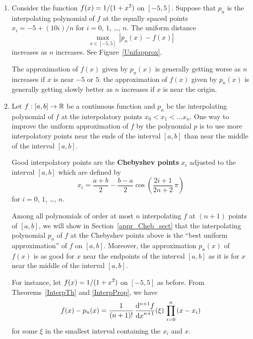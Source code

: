 \begin{rmkList}
\begin{enumerate}
\item Consider the function $\displaystyle f(x) = 1/(1+x^2)$ on
$[-5,5]$.  Suppose that $p_n$ is the interpolating polynomial of $f$
at the equally spaced points $x_i = -5 + (10i)/n$ for $i=0$, $1$, \ldots, $n$.
The uniform distance
\[
\max_{x \in [-5,5]}\,|p_n(x) - f(x)|
\]
increases as $n$ increases.  See Figure~\ref{Unifapprox}.

The approximation of $f(x)$ given by $p_n(x)$ is generally getting
worse as $n$ increases if $x$ is near $-5$ or $5$.  the approximation
of $f(x)$ given by $p_n(x)$ is generally getting slowly better as $n$
increases if $x$ is near the origin.


\item \label{appr_interp_rmk_lbl} Let $f:[a,b] \rightarrow \mathbb{R}$ be a
continuous function and $p_n$ be the interpolating polynomial of $f$ at the
interpolatory points $x_0 < x_1 < \ldots x_n$.  One way to improve the
uniform approximation of $f$ by the polynomial $p$ is to use more
interpolatory points near the ends of the interval $[a,b]$ than near the
middle of the interval $[a,b]$.

Good interpolatory points are the
{\bfseries Chebyshev points} $x_i$ adjusted to
the interval $[a,b]$ which are defined by
\[
x_i = \frac{a+b}{2} - \frac{b-a}{2}\cos\left(\frac{2i+1}{2n+2}\,\pi\right)
\]
for $i=0$, $1$, \ldots , $n$.

Among all polynomials of order at most $n$ interpolating $f$ at $(n+1)$
points of $[a,b]$, we will show in Section~\ref{appr_Cheb_sect} that the
interpolating polynomial $p_n$ of $f$ at the Chebyshev points above is
the ``best uniform approximation'' of $f$ on $[a,b]$.
Moreover, the approximation $p_n(x)$ of $f(x)$ is as good for $x$ near
the endpoints of the interval $[a,b]$ as it is for $x$ near the middle of
the interval $[a,b]$.

For instance, let $\displaystyle f(x) = 1/(1+x^2)$ on $[-5,5]$ as before.
From Theorems~\ref{InterpTh} and \ref{InterpProp}, we have
\[
f(x) - p_n(x) =
\frac{1}{(n+1)!}\,\displaystyle \frac{\mathrm{d}^{n+1}{f}} {\displaystyle \mathrm{d}{x}^{n+1}}(\xi) \, \prod_{i=0}^n\,(x-x_i)
\]
for some $\xi$ in the smallest interval containing the $x_i$ and $x$.


\end{enumerate}
\end{rmkList}
